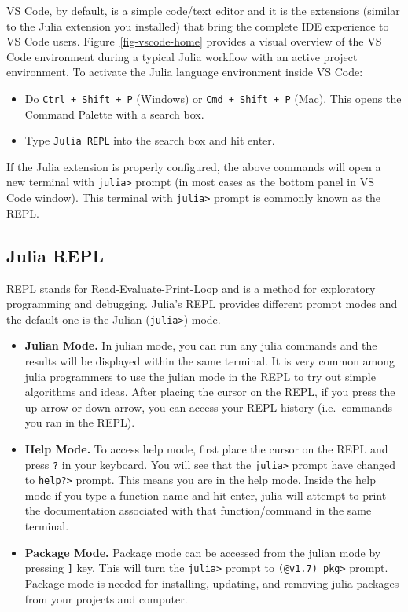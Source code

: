 \documentclass[
  letterpaper,
]{book}
\providecommand{\tightlist}{%
  \setlength{\itemsep}{0pt}\setlength{\parskip}{0pt}}\usepackage{longtable,booktabs,array}
\begin{document}
VS Code, by default, is a simple code/text editor and it is the
extensions (similar to the Julia extension you installed) that bring the
complete IDE experience to VS Code users. Figure~\ref{fig-vscode-home}
provides a visual overview of the VS Code environment during a typical
Julia workflow with an active project environment. To activate the Julia
language environment inside VS Code:

\begin{itemize}
\tightlist
\item
  Do \texttt{Ctrl\ +\ Shift\ +\ P} (Windows) or
  \texttt{Cmd\ +\ Shift\ +\ P} (Mac). This opens the Command Palette
  with a search box.
\item
  Type \texttt{Julia\ REPL} into the search box and hit enter.
\end{itemize}

If the Julia extension is properly configured, the above commands will
open a new terminal with \texttt{julia\textgreater{}} prompt (in most
cases as the bottom panel in VS Code window). This terminal with
\texttt{julia\textgreater{}} prompt is commonly known as the REPL.

\hypertarget{julia-repl}{%
\subsection{Julia REPL}\label{julia-repl}}

REPL stands for Read-Evaluate-Print-Loop and is a method for exploratory
programming and debugging. Julia's REPL provides different prompt modes
and the default one is the Julian (\texttt{julia\textgreater{}}) mode.

\begin{itemize}
\item
  \textbf{Julian Mode.} In julian mode, you can run any julia commands
  and the results will be displayed within the same terminal. It is very
  common among julia programmers to use the julian mode in the REPL to
  try out simple algorithms and ideas. After placing the cursor on the
  REPL, if you press the up arrow or down arrow, you can access your
  REPL history (i.e.~commands you ran in the REPL).
\item
  \textbf{Help Mode.} To access help mode, first place the cursor on the
  REPL and press \texttt{?} in your keyboard. You will see that the
  \texttt{julia\textgreater{}} prompt have changed to
  \texttt{help?\textgreater{}} prompt. This means you are in the help
  mode. Inside the help mode if you type a function name and hit enter,
  julia will attempt to print the documentation associated with that
  function/command in the same terminal.
\item
  \textbf{Package Mode.} Package mode can be accessed from the julian
  mode by pressing \texttt{{]}} key. This will turn the
  \texttt{julia\textgreater{}} prompt to
  \texttt{(@v1.7)\ pkg\textgreater{}} prompt. Package mode is needed for
  installing, updating, and removing julia packages from your projects
  and computer.
\end{itemize}
\end{document}
